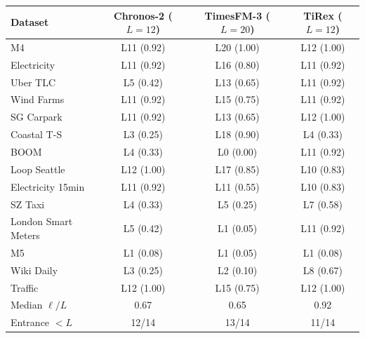 \begin{tabular}{lccc}
\toprule
Dataset & Chronos-2 ($L{=}12$) & TimesFM-3 ($L{=}20$) & TiRex ($L{=}12$) \\
\midrule
M4 & L11 (0.92) & L20 (1.00) & L12 (1.00) \\
Electricity & L11 (0.92) & L16 (0.80) & L11 (0.92) \\
Uber TLC & L5 (0.42) & L13 (0.65) & L11 (0.92) \\
Wind Farms & L11 (0.92) & L15 (0.75) & L11 (0.92) \\
SG Carpark & L11 (0.92) & L13 (0.65) & L12 (1.00) \\
Coastal T-S & L3 (0.25) & L18 (0.90) & L4 (0.33) \\
BOOM & L4 (0.33) & L0 (0.00) & L11 (0.92) \\
Loop Seattle & L12 (1.00) & L17 (0.85) & L10 (0.83) \\
Electricity 15min & L11 (0.92) & L11 (0.55) & L10 (0.83) \\
SZ Taxi & L4 (0.33) & L5 (0.25) & L7 (0.58) \\
London Smart Meters & L5 (0.42) & L1 (0.05) & L11 (0.92) \\
M5 & L1 (0.08) & L1 (0.05) & L1 (0.08) \\
Wiki Daily & L3 (0.25) & L2 (0.10) & L8 (0.67) \\
Traffic & L12 (1.00) & L15 (0.75) & L12 (1.00) \\
\midrule
Median $\ell/L$ & 0.67 & 0.65 & 0.92 \\
Entrance $<L$ & 12/14 & 13/14 & 11/14 \\
\bottomrule
\end{tabular}
